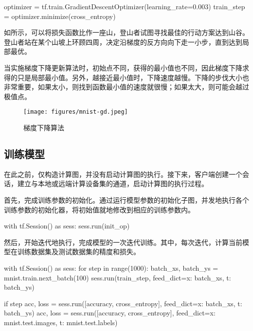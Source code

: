 \begin{content}
\begin{leftbar}
\begin{python}
optimizer = tf.train.GradientDescentOptimizer(learning_rate=0.003)
train_step = optimizer.minimize(cross_entropy)
\end{python}
\end{leftbar}

如所示，可以将损失函数比作一座山，登山者试图寻找最佳的行动方案达到山谷。登山者站在某个山坡上环顾四周，决定沿梯度的反方向向下走一小步，直到达到局部最优。

当实施梯度下降更新算法时，初始点不同，获得的最小值也不同，因此梯度下降求得的只是局部最小值。另外，越接近最小值时，下降速度越慢。下降的步伐大小也非常重要，如果太小，则找到函数最小值的速度就很慢；如果太大，则可能会越过极值点。

\begin{figure}[H]
\centering
\texttt{[image: figures/mnist-gd.jpeg]}
\caption{梯度下降算法}
 \label{fig:mnist-gd}
\end{figure}

\subsection{训练模型}

在此之前，\tf{}仅构造计算图，并没有启动计算图的执行。接下来，客户端创建一个会话，建立与本地或远端计算设备集的通道，启动计算图的执行过程。

首先，完成训练参数的初始化。通过运行模型参数的初始化子图，并发地执行各个训练参数的初始化器，将初始值就地修改到相应的训练参数内。

\begin{leftbar}
\begin{python}
with tf.Session() as sess:
  sess.run(init_op)
\end{python}
\end{leftbar}

然后，开始迭代地执行，完成模型的一次迭代训练。其中，每次迭代，计算当前模型在训练数据集及测试数据集的精度和损失。

\begin{leftbar}
\begin{python}
with tf.Session() as sess:
  for step in range(1000):
    batch_xs, batch_ys = mnist.train.next_batch(100)        
    sess.run(train_step, feed_dict={x: batch_xs, t: batch_ys})
    
    if step %
      acc, loss = sess.run([accuracy, cross_entropy], 
        feed_dict={x: batch_xs, t: batch_ys})
      acc, loss = sess.run([accuracy, cross_entropy], 
        feed_dict={x: mnist.test.images, t: mnist.test.labels}) 
\end{python}
\end{leftbar}


\end{content}
